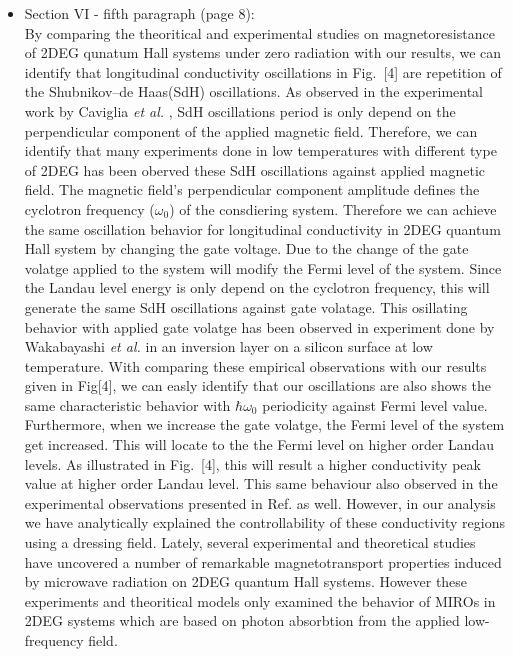 \documentclass{article}
\begin{document}
\begin{itemize}
  \item Section VI - fifth paragraph (page 8):\\
  {\color{Maroon}
  By comparing the theoritical \cite{ando72,ando74_1,ando74_2,ando74_3,ando74_4,ando82,endo09} and experimental \cite{endo09,wakabayashi78,ochiai190,mancoff96,arapov02,grbic04,caviglia10} studies on magnetoresistance of 2DEG qunatum Hall systems under zero radiation with our results, we can identify that longitudinal conductivity oscillations in Fig.~[4] are repetition of the Shubnikov–de Haas(SdH) oscillations.
  As observed in the experimental work by Caviglia \textit{et al.} \cite{caviglia10}, SdH oscillations period is only depend on the perpendicular component of the applied magnetic field.
  Therefore, we can identify that many experiments done in low temperatures \cite{endo09,ochiai190,mancoff96,arapov02,grbic04,caviglia10} with different type of 2DEG has been oberved these SdH oscillations against applied magnetic field.
  The magnetic field's perpendicular component amplitude defines the cyclotron frequency ($\omega_0$) of the consdiering system.
  Therefore we can achieve the same oscillation behavior for longitudinal conductivity in 2DEG quantum Hall system by changing the gate voltage. Due to the change of the gate volatge applied to the system will modify the Fermi level of the system.
  Since the Landau level energy is only depend on the cyclotron frequency, this will generate the same SdH oscillations against gate volatage.
  This osillating behavior with applied gate volatge has been observed in experiment done by Wakabayashi \textit{et al.} \cite{wakabayashi78} in an inversion layer on a silicon surface at low temperature. With comparing these empirical observations with our results given in Fig[4], we can easly identify that our oscillations are also shows the same characteristic behavior with $\hbar\omega_0$ periodicity against Fermi level value. Furthermore, when we increase the gate volatge, the Fermi level of the system get increased. This will locate to the the Fermi level on higher order Landau levels. As illustrated in Fig.~[4], this will result a higher conductivity peak value at higher order Landau level. This same behaviour also observed in the experimental observations presented in Ref. \cite{wakabayashi78} as well. However, in our analysis we have analytically explained the controllability of these conductivity regions using a dressing field.
  Lately, several experimental \cite{zudov01,mani02,zudov03,mani04} and theoretical \cite{durst03,dmitriev03,dmitriev05,dmitriev09} studies have uncovered a number of remarkable magnetotransport properties induced by microwave radiation on 2DEG quantum Hall systems. However these experiments and theoritical models only examined the behavior of MIROs in 2DEG systems which are based on photon absorbtion from the applied low-frequency field.
}
\end{itemize}
\end{document}
